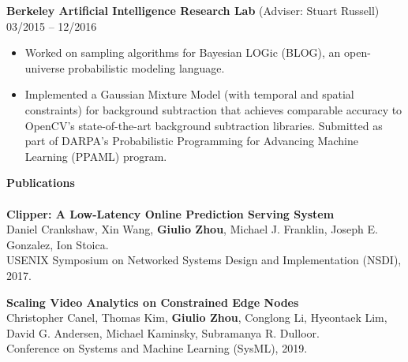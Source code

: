 \documentclass{article}
\begin{document}
\noindent
\textbf{Berkeley Artificial Intelligence Research Lab} (Adviser: Stuart Russell)
\hfill 03/2015 -- 12/2016
\begin{itemize}
\vspace{-2.5mm}
\item Worked on sampling algorithms for Bayesian LOGic (BLOG), an open-universe probabilistic modeling language.
\vspace{-6.5mm}
\item Implemented a Gaussian Mixture Model (with temporal and spatial constraints) for background subtraction that achieves comparable accuracy to OpenCV's
      state-of-the-art background subtraction libraries. Submitted as part of DARPA's Probabilistic Programming for Advancing Machine Learning (PPAML) program.
\end{itemize}
% 

\noindent
\textbf{\Large Publications}\\[-2mm]
\HRule\\
\noindent
\textbf{Clipper: A Low-Latency Online Prediction Serving System} \\
Daniel Crankshaw, Xin Wang, \textbf{Giulio Zhou}, Michael J. Franklin, Joseph E. Gonzalez, Ion Stoica. \\
USENIX Symposium on Networked Systems Design and Implementation (NSDI), 2017. \\
\vspace{-3mm}

\noindent
\textbf{Scaling Video Analytics on Constrained Edge Nodes} \\
Christopher Canel, Thomas Kim, \textbf{Giulio Zhou}, Conglong Li, Hyeontaek Lim, David G. Andersen, Michael Kaminsky, Subramanya R. Dulloor. \\
Conference on Systems and Machine Learning (SysML), 2019. \\
\vspace{-3mm}
\end{document}
